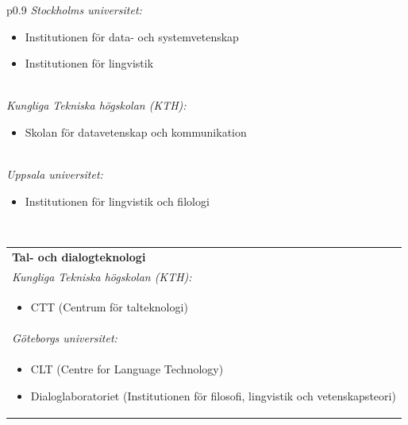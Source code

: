 \begin{multicols}{2}
\begin{minipage}[t]{\linewidth}
\begin{tabular}{p{0.9\columnwidth}}
{\emph{Stockholms universitet:}} \\
\parbox[b]{0.9\columnwidth}{%
\begin{itemize}
\item Institutionen för data- och systemvetenskap
\item Institutionen för lingvistik
\end{itemize}} \\
{\emph{Kungliga Tekniska högskolan (KTH):}} \\
\begin{itemize} \item \vspace{-20pt} Skolan för datavetenskap och kommunikation \vspace{-20pt} \end{itemize} \\ \addlinespace
{\emph{Uppsala universitet:}} \\
\begin{itemize} \item \vspace{-20pt} Institutionen för lingvistik och filologi \vspace{-20pt} \end{itemize} \\ %
\end{tabular}
\end{minipage}

\begin{minipage}[t]{\linewidth}
\begin{tabular}{p{}}
{\textbf{Tal- och dialogteknologi}} \\
{\emph{Kungliga Tekniska högskolan (KTH):}} \\
\begin{itemize} \item \vspace{-20pt} CTT (Centrum för talteknologi) \vspace{-20pt} \end{itemize} \\ \addlinespace
{\emph{Göteborgs universitet:}} \\
\parbox[b]{0.9\columnwidth}{%
\begin{itemize}
\item CLT (Centre for Language Technology)
\item Dialoglaboratoriet (Institutionen för filo\-sofi, lingvistik och vetenskapsteori)
\end{itemize}} \\ \addlinespace \addlinespace \addlinespace
\end{tabular}
\end{minipage}


\end{multicols}
